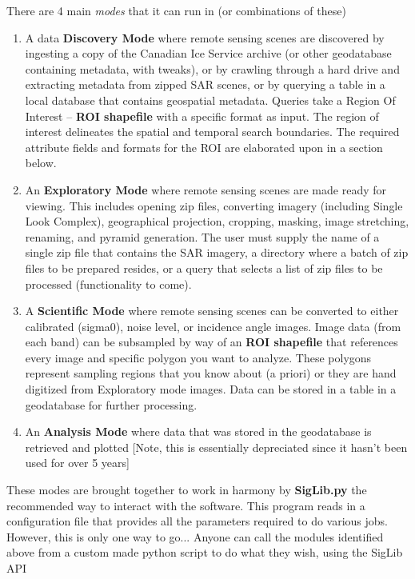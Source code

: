\documentclass[letterpaper,10pt,openany,oneside]{sphinxmanual}
\begin{document}
There are 4 main \emph{modes} that it can run in (or combinations of these)
\begin{enumerate}
\item {} 
A data \textbf{Discovery Mode} where remote sensing scenes are discovered
by ingesting a copy of the Canadian Ice Service archive (or other
geodatabase containing metadata, with tweaks), or by crawling through
a hard drive and extracting metadata from zipped SAR scenes, or by
querying a table in a local database that contains geospatial
metadata. Queries take a Region Of Interest -- \textbf{ROI shapefile} with
a specific format as input. The region of interest delineates the
spatial and temporal search boundaries. The required attribute fields
and formats for the ROI are elaborated upon in a section below.

\item {} 
An \textbf{Exploratory Mode} where remote sensing scenes are made ready
for viewing. This includes opening zip files, converting imagery
(including Single Look Complex), geographical projection, cropping,
masking, image stretching, renaming, and pyramid generation. The user
must supply the name of a single zip file that contains the SAR
imagery, a directory where a batch of zip files to be prepared
resides, or a query that selects a list of zip files to be processed
(functionality to come).

\item {} 
A \textbf{Scientific Mode} where remote sensing scenes can be converted to
either calibrated (sigma0), noise level, or incidence angle images.
Image data (from each band) can be subsampled by way of an \textbf{ROI
shapefile} that references every image and specific polygon you want
to analyze. These polygons represent sampling regions that you know
about (a priori) or they are hand digitized from Exploratory mode
images. Data can be stored in a table in a geodatabase for further
processing.

\item {} 
An \textbf{Analysis Mode} where data that was stored in the geodatabase is
retrieved and plotted {[}Note, this is essentially depreciated since it
hasn't been used for over 5 years{]}

\end{enumerate}

These modes are brought together to work in harmony by \textbf{SigLib.py} the
recommended way to interact with the software. This program reads in a
configuration file that provides all the parameters required to do
various jobs. However, this is only one way to go... Anyone can call the
modules identified above from a custom made python script to do what
they wish, using the SigLib API
\end{document}
